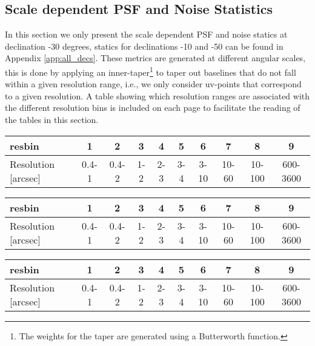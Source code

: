 \documentclass[sfheadings,a4paper,times,9pt,floats,floatfix]{article}
\begin{document}
\begin{landscape}
\subsection{Scale dependent PSF and Noise Statistics}
In this section we only present the scale dependent PSF and noise statics at declination -30 degrees, statics for
declinations -10 and -50 can be found in Appendix \ref{app:all_decs}. These metrics are generated at different angular
scales, this is done by applying an inner-taper\footnote{The weights for the taper are generated using a Butterworth
function.} to taper out baselines that do not fall within a given resolution range, i.e., we only consider uv-points
that correspond to a given resolution. A table showing which resolution ranges are associated with the different resolution bins
is included on each page to facilitate the reading of the tables in this section.
 \begin{table}[H]
  \begin{tabular}{|l|ccccccccc|}\hline
  resbin & 1 & 2 & 3 & 4 & 5 & 6 & 7 & 8 & 9 \\\hline
  Resolution [arcsec] & 0.4-1 & 0.4-2 & 1-2 & 2-3 & 3-4 & 3-10 & 10-60 & 10-100 & 600-3600 \\\hline
  \end{tabular}
 \end{table}

 
 
 
\end{landscape}
\begin{landscape}
 \begin{table}[H]
  \begin{tabular}{|lccccccccc|}\hline
  resbin & 1 & 2 & 3 & 4 & 5 & 6 & 7 & 8 & 9 \\\hline
  Resolution [arcsec] & 0.4-1 & 0.4-2 & 1-2 & 2-3 & 3-4 & 3-10 & 10-60 & 10-100 & 600-3600 \\\hline
  \end{tabular}
 \end{table}
 
 
 
\end{landscape}
 \begin{table}[H]
  \begin{tabular}{|lccccccccc|}\hline
  resbin & 1 & 2 & 3 & 4 & 5 & 6 & 7 & 8 & 9 \\\hline
  Resolution [arcsec] & 0.4-1 & 0.4-2 & 1-2 & 2-3 & 3-4 & 3-10 & 10-60 & 10-100 & 600-3600 \\\hline
  \end{tabular}
 \end{table}
\end{document}
